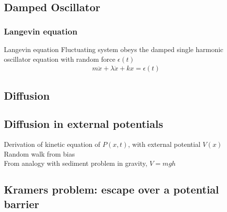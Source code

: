 \documentclass[10pt,a4paper]{article}
\begin{document}
    \subsection{Damped Oscillator}
        \subsubsection{Langevin equation}
            \begin{theorem}{Langevin equation}
                {
                Fluctuating system obeys the damped single harmonic oscillator equation with random force $\epsilon(t)$
                \begin{align*}
                    m\ddot{x}+\lambda\dot{x}+kx=\epsilon(t)
                \end{align*}
                }
            \end{theorem}
    \subsection{Diffusion}
    \subsection{Diffusion in external potentials}
    \begin{example}
        {Derivation of kinetic equation of $P(x,t)$, with external potential $V(x)$}
        {
        {Random walk from bias}\\
        {From analogy with sediment problem in gravity, $V=mgh$} 
        }
    \end{example}
    \subsection{Kramers problem: escape over a potential barrier}
\end{document}
